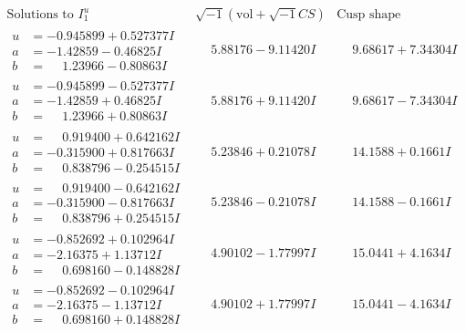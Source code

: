 \documentclass[1p]{elsarticle_modified}
\theoremstyle{definition}
\newcommand{\I}{\sqrt{-1}}
\begin{document}
$$\begin{array}{c|c|c}  
\text{Solutions to }I^u_{1}& \I (\text{vol} + \sqrt{-1}CS) & \text{Cusp shape}\\
 \hline 
\begin{aligned}
u &= -0.945899 + 0.527377 I \\
a &= -1.42859 - 0.46825 I \\
b &= \phantom{-}1.23966 - 0.80863 I\end{aligned}
 & \phantom{-}5.88176 - 9.11420 I & \phantom{-}9.68617 + 7.34304 I \\ \hline\begin{aligned}
u &= -0.945899 - 0.527377 I \\
a &= -1.42859 + 0.46825 I \\
b &= \phantom{-}1.23966 + 0.80863 I\end{aligned}
 & \phantom{-}5.88176 + 9.11420 I & \phantom{-}9.68617 - 7.34304 I \\ \hline\begin{aligned}
u &= \phantom{-}0.919400 + 0.642162 I \\
a &= -0.315900 + 0.817663 I \\
b &= \phantom{-}0.838796 - 0.254515 I\end{aligned}
 & \phantom{-}5.23846 + 0.21078 I & \phantom{-}14.1588 + 0.1661 I \\ \hline\begin{aligned}
u &= \phantom{-}0.919400 - 0.642162 I \\
a &= -0.315900 - 0.817663 I \\
b &= \phantom{-}0.838796 + 0.254515 I\end{aligned}
 & \phantom{-}5.23846 - 0.21078 I & \phantom{-}14.1588 - 0.1661 I \\ \hline\begin{aligned}
u &= -0.852692 + 0.102964 I \\
a &= -2.16375 + 1.13712 I \\
b &= \phantom{-}0.698160 - 0.148828 I\end{aligned}
 & \phantom{-}4.90102 - 1.77997 I & \phantom{-}15.0441 + 4.1634 I \\ \hline\begin{aligned}
u &= -0.852692 - 0.102964 I \\
a &= -2.16375 - 1.13712 I \\
b &= \phantom{-}0.698160 + 0.148828 I\end{aligned}
 & \phantom{-}4.90102 + 1.77997 I & \phantom{-}15.0441 - 4.1634 I \\ \hline\begin{aligned}

\end{aligned}
\end{array}$$
\end{document}
